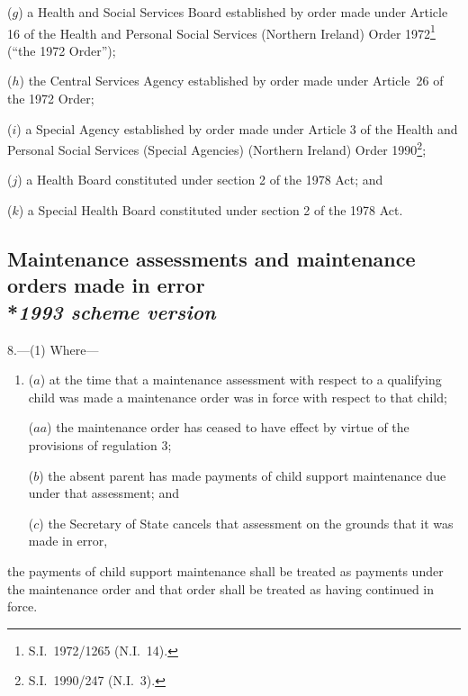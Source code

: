 \documentclass[12pt,a4paper]{article}
\begin{document}
\begin{enumerate}
($g$) a Health and Social Services Board established by order made under Article 16 of the Health and Personal Social Services (Northern Ireland) Order 1972\footnote{S.I.\ 1972/1265 (N.I.~14).} (“the 1972 Order”);

($h$) the Central Services Agency established by order made under Article~26 of the 1972 Order;

($i$) a Special Agency established by order made under Article 3 of the Health and Personal Social Services (Special Agencies) (Northern Ireland) Order 1990\footnote{S.I.\ 1990/247 (N.I.~3).};

($j$) a Health Board constituted under section 2 of the 1978 Act; and

($k$) a Special Health Board constituted under section 2 of the 1978 Act.
\end{enumerate}


\subsection[8. Maintenance assessments and maintenance orders made in error --- \emph{1993 scheme version}]{Maintenance assessments and maintenance orders made in error\\*\emph{1993 scheme version}}

8.—(1) Where—
\begin{enumerate}\item[]
($a$) at the time that a maintenance assessment with respect to a qualifying child was made a maintenance order was in force with respect to that child;

($aa$) the maintenance order has ceased to have effect by virtue of the provisions of regulation 3;

($b$) the absent parent has made payments of child support maintenance due under that assessment; and

($c$) 
the Secretary of State  %
cancels that assessment on the grounds that it was made in error,
\end{enumerate}
the payments of child support maintenance shall be treated as payments under the maintenance order and that order shall be treated as having continued in force.
\end{document}
